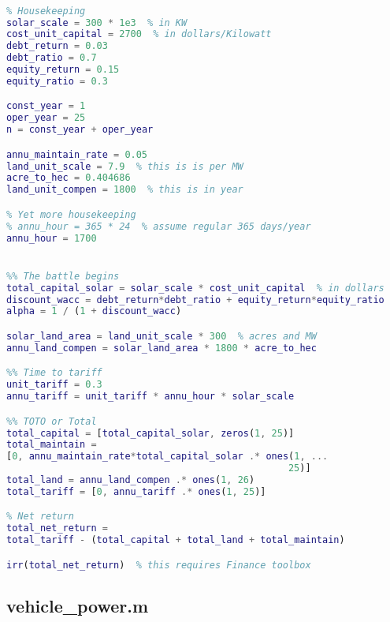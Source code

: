 \documentclass[12pt]{article}
\begin{document}
\begin{lstlisting}[language=Matlab]
%% Levelized cost of energy

% Housekeeping
solar_scale = 300 * 1e3  % in KW
cost_unit_capital = 2700  % in dollars/Kilowatt
debt_return = 0.03
debt_ratio = 0.7
equity_return = 0.15
equity_ratio = 0.3

const_year = 1
oper_year = 25
n = const_year + oper_year

annu_maintain_rate = 0.05
land_unit_scale = 7.9  % this is is per MW
acre_to_hec = 0.404686
land_unit_compen = 1800  % this is in year

% Yet more housekeeping
% annu_hour = 365 * 24  % assume regular 365 days/year
annu_hour = 1700


%% The battle begins
total_capital_solar = solar_scale * cost_unit_capital  % in dollars
discount_wacc = debt_return*debt_ratio + equity_return*equity_ratio
alpha = 1 / (1 + discount_wacc)

solar_land_area = land_unit_scale * 300  % acres and MW
annu_land_compen = solar_land_area * 1800 * acre_to_hec

%% Time to tariff
unit_tariff = 0.3
annu_tariff = unit_tariff * annu_hour * solar_scale

%% TOTO or Total
total_capital = [total_capital_solar, zeros(1, 25)]
total_maintain = 
[0, annu_maintain_rate*total_capital_solar .* ones(1, ...
                                                  25)]
total_land = annu_land_compen .* ones(1, 26)
total_tariff = [0, annu_tariff .* ones(1, 25)]

% Net return
total_net_return = 
total_tariff - (total_capital + total_land + total_maintain)

irr(total_net_return)  % this requires Finance toolbox

\end{lstlisting}

\subsection{vehicle\_power.m}
\label{sec:vehicle_power.m}
\end{document}

